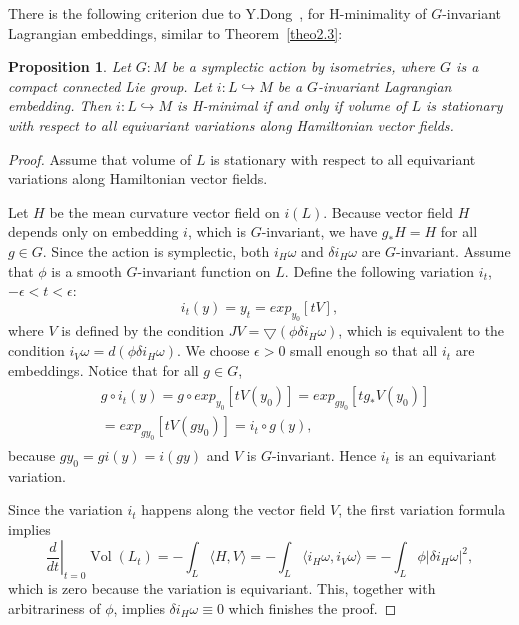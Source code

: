 \documentclass[jsg]{IP_v1_forauthors}
\def\Vol{\mathop{\mathrm{Vol}}}
\newtheorem{prop}[theo]{Proposition}
\theoremstyle{definition}
\numberwithin{equation}{section}
\begin{document}
There is the following criterion due to Y.Dong~\cite{D}, for H-minimality of $G$-invariant Lagrangian embeddings, similar to Theorem~\ref{theo2.3}:
\begin{prop}
Let $G:M$ be a symplectic action by isometries, where $G$ is a compact connected Lie group. Let $i: L \hookrightarrow M$ be a $G$-invariant Lagrangian embedding. Then $i: L \hookrightarrow M$ is H-minimal if and only if volume of $L$ is stationary with respect to all equivariant variations along Hamiltonian vector fields.
\end{prop}
\begin{proof}

Assume that volume of $L$ is stationary with respect to all equivariant variations along Hamiltonian vector fields.

Let $H$ be the mean curvature vector field on $i(L)$. Because vector field $H$ depends only on embedding $i$, which is $G$-invariant, we have $g_{*}H=H$ for all $g \in G$. Since the action is symplectic, both $i_H\omega$ and $\delta i_H\omega$ are $G$-invariant. Assume that $\phi$ is a smooth $G$-invariant function on $L$. Define the following variation $i_t$, $-\epsilon < t < \epsilon$:
\begin{equation} 
i_t(y)=y_t=exp_{y_0}[tV],
\end{equation}
where $V$ is defined by the condition $JV=\bigtriangledown (\phi \delta i_H\omega)$, which is equivalent to the condition $i_V \omega =  d(\phi \delta i_H \omega)$. We choose $\epsilon > 0$ small enough so that all $i_t$ are embeddings. Notice that for all $g \in G$,
\begin{align}
\begin{split}
& g \circ i_t(y) = g \circ exp_{y_0}[t V(y_0)]
=exp_{g y_0}[t g_* V(y_0)] \\
&=  exp_{g y_0}[t V(g y_0)] = i_t \circ g(y),
\end{split}
\end{align}
because $g y_0 = g i(y) = i (gy)$ and $V$ is $G$-invariant. Hence $i_t$ is an equivariant variation.

Since the variation $i_t$ happens along the vector field $V$, the first variation formula implies
\begin{equation}
    \left. \frac {{d}}{{d}t} \right |_{t=0} \Vol(L_t) = - \int_L \langle H,V \rangle = - \int_L \langle i_H\omega,i_V\omega \rangle = - \int_L \phi |\delta i_H \omega|^2 , 
\end{equation}
which is zero because the variation is equivariant. This, together with arbitrariness of $\phi$, implies $\delta i_H\omega \equiv 0$ which finishes the proof.
\end{proof}
\end{document}
